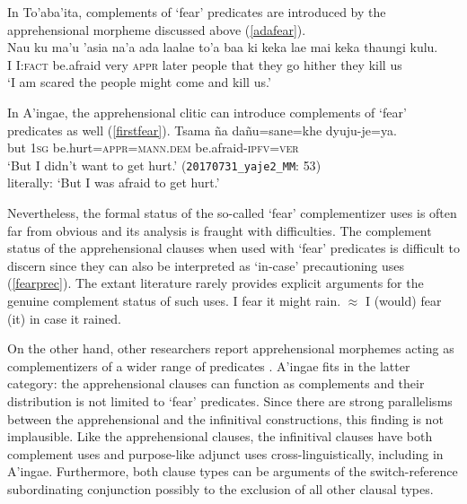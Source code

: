\documentclass[output=paper,colorlinks,citecolor=brown]{langscibook}
\begin{document}
In To’aba’ita, complements of `fear' predicates are introduced by the apprehensional morpheme  discussed above (\ref{adafear}).
    \ea \label{adafear}
     \\
    \gll Nau ku ma'u {'asia na'a} {\ob}ada laalae to'a baa {ki keka} lae mai keka thaungi kulu.{\cb} \\
    I I:\textsc{fact} {be.afraid} very \textsc{appr} later people that they go hither they kill us\\
    \glt `I am scared the people might come and kill us.'
    \z
    
In A'ingae, the apprehensional clitic  can introduce complements of `fear' predicates as well (\ref{firstfear}).
    \ea \label{firstfear} %
    \gll Tsama ña   {{\ob}dañu=sane=khe{\cb}}         dyuju-je=ya. \\
         but \textsc{1sg} {be.hurt=\textsc{appr=mann.dem}} {be.afraid-\textsc{ipfv=ver}} \\
    \glt `But I didn't want to get hurt.' \hfill (\texttt{20170731\_yaje2\_MM}: {\textsc{53})} \nopagebreak\\\nopagebreak
    literally: `But I was afraid to get hurt.'
    \z 
    
Nevertheless, the formal status of the so-called `fear' complementizer uses is often far from obvious and its analysis is fraught with difficulties.
The complement status of the apprehensional clauses when used with `fear' predicates is difficult to discern since they can also be interpreted as `in-case' precautioning uses (\ref{fearprec}). The extant literature rarely provides explicit arguments for the genuine complement status of such uses.
    \ea \label{fearprec}
    \glt I fear it might rain. $\approx$ I (would) fear (it) in case it rained.
    \z 

On the other hand, other researchers report apprehensional morphemes acting as complementizers of a wider range of predicates \citep{yallop1997alyawarra, francois2003semantique}. A'ingae fits in the latter category: the apprehensional  clauses can function as complements and their distribution is not limited to `fear' predicates. Since there are strong parallelisms between the apprehensional and the infinitival constructions, this finding is not implausible. Like the apprehensional  clauses, the infinitival  clauses have both complement uses and purpose-like adjunct uses cross-linguistically, including in A'ingae. Furthermore, both clause types can be {arguments} of the switch-reference subordinating conjunction \srcn[,] possibly to the exclusion of all other clausal types.
\end{document}
